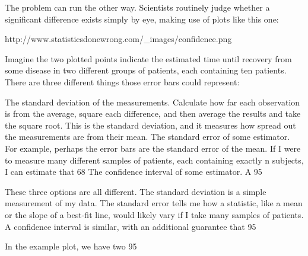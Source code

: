 The problem can run the other way. Scientists routinely judge whether a significant difference exists simply by eye, making use of plots like this one:

http://www.statisticsdonewrong.com/_images/confidence.png


Imagine the two plotted points indicate the estimated time until recovery from some disease in two different groups of patients, each containing ten patients. There are three different things those error bars could represent:

    The standard deviation of the measurements. Calculate how far each observation is from the average, square each difference, and then average the results and take the square root. This is the standard deviation, and it measures how spread out the measurements are from their mean.
    The standard error of some estimator. For example, perhaps the error bars are the standard error of the mean. If I were to measure many different samples of patients, each containing exactly n subjects, I can estimate that 68%
    The confidence interval of some estimator. A 95%

These three options are all different. The standard deviation is a simple measurement of my data. The standard error tells me how a statistic, like a mean or the slope of a best-fit line, would likely vary if I take many samples of patients. A confidence interval is similar, with an additional guarantee that 95%

In the example plot, we have two 95%

